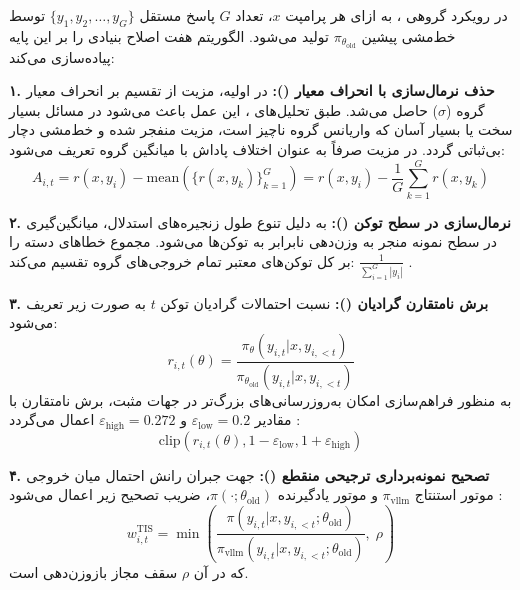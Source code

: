 در رویکرد گروهی ، به ازای هر پرامپت $x$، تعداد $G$ پاسخ مستقل $\{y_1, y_2, \dots, y_G\}$ توسط خط‌مشی پیشین $\pi_{\theta_{\text{old}}}$ تولید می‌شود. الگوریتم  هفت اصلاح بنیادی را بر این پایه پیاده‌سازی می‌کند:

\textbf{۱. حذف نرمال‌سازی با انحراف معیار ():}
در  اولیه، مزیت از تقسیم بر انحراف معیار گروه ($\sigma$) حاصل می‌شد. طبق تحلیل‌های \cite{liu2025drgrpo}، این عمل باعث می‌شود در مسائل بسیار سخت یا بسیار آسان که واریانس گروه ناچیز است، مزیت منفجر شده و خط‌مشی دچار بی‌ثباتی گردد. در  مزیت صرفاً به عنوان اختلاف پاداش با میانگین گروه تعریف می‌شود:
\begin{equation}
	A_{i,t} = r(x, y_i) - \text{mean}\left( \{r(x, y_k)\}_{k=1}^G \right) = r(x, y_i) - \frac{1}{G}\sum_{k=1}^G r(x, y_k)
\end{equation}

\textbf{۲. نرمال‌سازی در سطح توکن ():}
به دلیل تنوع طول زنجیره‌های استدلال، میانگین‌گیری در سطح نمونه منجر به وزن‌دهی نابرابر به توکن‌ها می‌شود.  مجموع خطاهای دسته را بر کل توکن‌های معتبر تمام خروجی‌های گروه تقسیم می‌کند: $\frac{1}{\sum_{i=1}^G |y_i|}$ \cite{yu2025dapo}.

\textbf{۳. برش نامتقارن گرادیان ():}
نسبت احتمالات گرادیان توکن $t$ به صورت زیر تعریف می‌شود:
\begin{equation}
	r_{i,t}(\theta) = \frac{\pi_\theta(y_{i,t} | x, y_{i,<t})}{\pi_{\theta_{\text{old}}}(y_{i,t} | x, y_{i,<t})}
\end{equation}
به منظور فراهم‌سازی امکان به‌روزرسانی‌های بزرگ‌تر در جهات مثبت، برش نامتقارن با مقادیر $\varepsilon_{\text{low}} = 0.2$ و $\varepsilon_{\text{high}} = 0.272$ اعمال می‌گردد \cite{yu2025dapo}:
\begin{equation}
	\text{clip}\left(r_{i,t}(\theta), 1 - \varepsilon_{\text{low}}, 1 + \varepsilon_{\text{high}}\right)
\end{equation}

\textbf{۴. تصحیح نمونه‌برداری ترجیحی منقطع ():}
جهت جبران رانش احتمال میان خروجی موتور استنتاج $\pi_{\text{vllm}}$ و موتور یادگیرنده $\pi(\cdot; \theta_{\text{old}})$، ضریب تصحیح زیر اعمال می‌شود \cite{yao2025offpolicy}:
\begin{equation}
	w_{i,t}^{\text{TIS}} = \min \left( \frac{\pi(y_{i,t} | x, y_{i,<t}; \theta_{\text{old}})}{\pi_{\text{vllm}}(y_{i,t} | x, y_{i,<t}; \theta_{\text{old}})}, \; \rho \right)
\end{equation}
که در آن $\rho$ سقف مجاز بازوزن‌دهی است.

